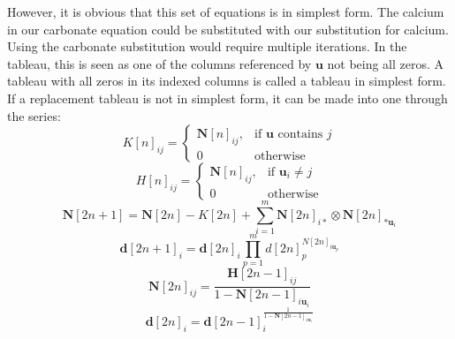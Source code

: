 \documentclass{article}
\newcommand{\matr}[1]{\bm{#1}}
\newcommand{\vect}[1]{\bm{#1}}
\begin{document}
However, it is obvious that this set of equations is in simplest form. The calcium in our carbonate equation could be substituted with our substitution for calcium. Using the carbonate substitution would require multiple iterations. In the tableau, this is seen as one of the columns referenced by $\vect{u}$ not being all zeros. A tableau with all zeros in its indexed columns is called a tableau in simplest form. If a replacement tableau is not in simplest form, it can be made into one through the series:
\begin{equation*}
    K[n]_{ij}=\begin{cases}
        \matr{N}[n]_{ij},& \text{if } \vect{u} \text{ contains } j \\
        0 & \text{otherwise}
        \end{cases}
\end{equation*}
\begin{equation*}
    H[n]_{ij}=
        \begin{cases}
        \matr{N}[n]_{ij},& \text{if } \vect{u}_i\neq j \\
        0 & \text{otherwise}
        \end{cases}
\end{equation*}
\begin{equation*}
    \matr{N}[2n+1]=\matr{N}[2n]-K[2n]+\sum_{i=1}^{m}\matr{N}[2n]_{i*}\otimes\matr{N}[2n]_{*\vect{u}_i}
\end{equation*}
\begin{equation*}
    \vect{d}[2n+1]_i=\vect{d}[2n]_i\prod_{p=1}^m d[2n]_p^{N[2n]_{i\vect{u}_p}}
\end{equation*}
\begin{equation*}
    \matr{N}[2n]_{ij}=\frac{\matr{H}[2n-1]_{ij}}{1-\matr{N}[2n-1]_{i\vect{u}_i}}
\end{equation*}
\begin{equation*}
    \vect{d}[2n]_i=\vect{d}[2n-1]_i^{\frac{1}{1-\matr{N}[2n-1]_{1\vect{u}_i}}}
\end{equation*}
\end{document}
